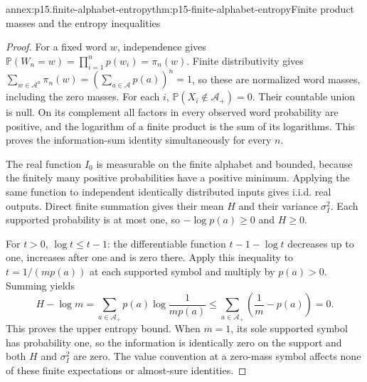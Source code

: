 \begin{annexitem}{annex:p15.finite-alphabet-entropy}{thm:p15-finite-alphabet-entropy}{Finite product masses and the entropy inequalities}
\begin{proof}
For a fixed word \(w\), independence gives
\(\mathbb P(W_n=w)=\prod_{i=1}^np(w_i)=\pi_n(w)\).
Finite distributivity gives
\(\sum_{w\in\mathcal A^n}\pi_n(w)=(\sum_{a\in\mathcal A}p(a))^n=1\),
so these are normalized word masses, including the zero masses.
For each \(i\), \(\mathbb P(X_i\notin\mathcal A_+)=0\).
Their countable union is null. On its complement all factors in
every observed word probability are positive, and the logarithm of
a finite product is the sum of its logarithms. This proves the
information-sum identity simultaneously for every \(n\).

The real function \(I_0\) is measurable on the finite alphabet and
bounded, because the finitely many positive probabilities have a
positive minimum. Applying the same function to independent identically
distributed inputs gives i.i.d. real outputs. Direct finite summation
gives their mean \(H\) and their variance \(\sigma_I^2\).
Each supported probability is at most one, so \(-\log p(a)\geq0\)
and \(H\geq0\).

For \(t>0\), \(\log t\leq t-1\): the differentiable function
\(t-1-\log t\) decreases up to one, increases after one and is
zero there. Apply this inequality to \(t=1/(mp(a))\) at each
supported symbol and multiply by \(p(a)>0\). Summing yields
\[
 H-\log m
  =\sum_{a\in\mathcal A_+}p(a)\log\frac1{mp(a)}
  \leq\sum_{a\in\mathcal A_+}\left(\frac1m-p(a)\right)=0.
\]
This proves the upper entropy bound. When \(m=1\), its sole supported
symbol has probability one, so the information is identically zero
on the support and both \(H\) and \(\sigma_I^2\) are zero.
The value convention at a zero-mass symbol affects none of these
finite expectations or almost-sure identities.
\end{proof}
\end{annexitem}


